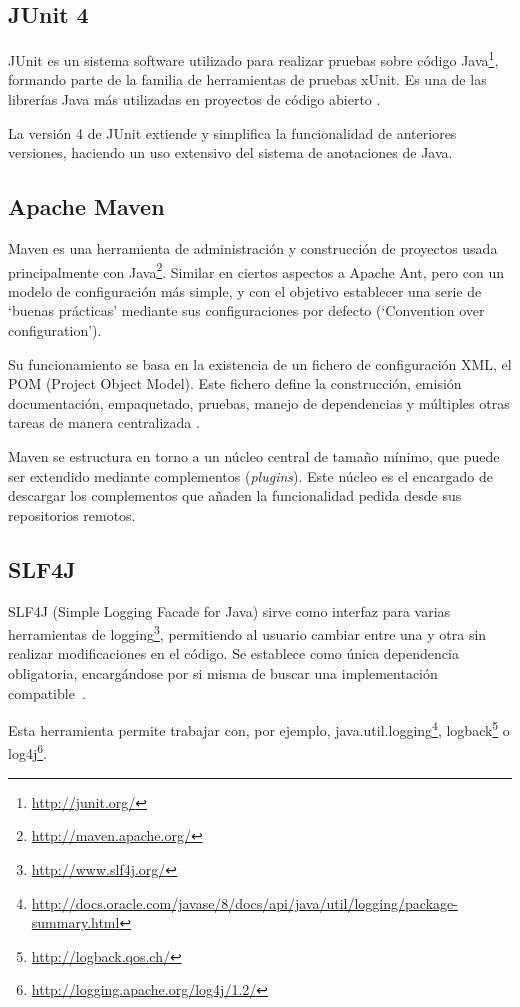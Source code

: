 \subsection{JUnit 4}
JUnit es un sistema software utilizado para realizar pruebas sobre código Java\footnote{\url{http://junit.org/}}, formando parte de la familia de herramientas de pruebas xUnit.
Es una de las librerías Java más utilizadas en proyectos de código abierto \cite{website:githubTOP}.

La versión 4 de JUnit extiende y simplifica la funcionalidad de anteriores versiones, haciendo un uso extensivo del sistema de anotaciones de Java.

\subsection{Apache Maven}
Maven es una herramienta de administración y construcción de proyectos usada principalmente con Java\footnote{\url{http://maven.apache.org/}}.
Similar en ciertos aspectos a Apache Ant, pero con un modelo de configuración más simple, y con el objetivo establecer una serie de `buenas prácticas' mediante sus configuraciones por defecto (`Convention over configuration').

Su funcionamiento se basa en la existencia de un fichero de configuración XML, el POM (Project Object Model).
Este fichero define la construcción, emisión documentación, empaquetado, pruebas, manejo de dependencias y múltiples otras tareas de manera centralizada \cite{mvnEx}.

Maven se estructura en torno a un núcleo central de tamaño mínimo, que puede ser extendido mediante complementos (\emph{plugins}).
Este núcleo es el encargado de descargar los complementos que añaden la funcionalidad pedida desde sus repositorios remotos.

\subsection{SLF4J}
SLF4J (Simple Logging Facade for Java) sirve como interfaz para varias herramientas de logging\footnote{\url{http://www.slf4j.org/}}, permitiendo al usuario cambiar entre una y otra sin realizar modificaciones en el código.
Se establece como única dependencia obligatoria, encargándose por si misma de buscar una implementación compatible~\cite{website:slf4j}.

Esta herramienta permite trabajar con, por ejemplo, java.util.logging\footnote{\url{http://docs.oracle.com/javase/8/docs/api/java/util/logging/package-summary.html}}, logback\footnote{\url{http://logback.qos.ch/}} o log4j\footnote{\url{http://logging.apache.org/log4j/1.2/}}.

